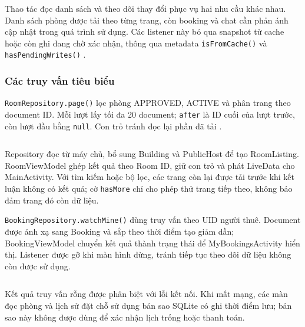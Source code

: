Thao tác đọc danh sách và theo dõi thay đổi phục vụ hai nhu cầu khác nhau. Danh sách phòng được tải theo từng trang, còn booking và chat cần phản ánh cập nhật trong quá trình sử dụng. Các listener này bỏ qua snapshot từ cache hoặc còn ghi đang chờ xác nhận, thông qua metadata \texttt{isFrom\allowbreak{}Cache()} và \texttt{hasPending\allowbreak{}Writes()} \parencite{firebase_listeners}.


\subsubsection{Các truy vấn tiêu biểu}
\texttt{RoomRepository.page()} lọc phòng APPROVED, ACTIVE và phân trang theo document ID. Mỗi lượt lấy tối đa 20 document; \texttt{after} là ID cuối của lượt trước, còn lượt đầu bằng \texttt{null}. Con trỏ tránh đọc lại phần đã tải \parencite{firebase_queries,firebase_query_cursors}.

\par\medskip\noindent\begin{minipage}{\linewidth}
\inputminted[firstnumber=1]{java}{Resources/chapter4/code/room-query.java}
\end{minipage}\par\medskip

Repository đọc từ máy chủ, bổ sung Building và PublicHost để tạo RoomListing. RoomViewModel ghép kết quả theo Room ID, giữ con trỏ và phát LiveData cho MainActivity. Với tìm kiếm hoặc bộ lọc, các trang còn lại được tải trước khi kết luận không có kết quả; cờ \texttt{hasMore} chỉ cho phép thử trang tiếp theo, không bảo đảm trang đó còn dữ liệu.

\texttt{BookingRepository.watchMine()} dùng truy vấn theo UID người thuê. Document được ánh xạ sang Booking và sắp theo thời điểm tạo giảm dần; BookingViewModel chuyển kết quả thành trạng thái để MyBookingsActivity hiển thị. Listener được gỡ khi màn hình dừng, tránh tiếp tục theo dõi dữ liệu không còn được sử dụng.

\par\medskip\noindent\begin{minipage}{\linewidth}
\inputminted[firstnumber=1]{java}{Resources/chapter4/code/booking-query-listener.java}
\end{minipage}\par\medskip

Kết quả truy vấn rỗng được phân biệt với lỗi kết nối. Khi mất mạng, các màn đọc phòng và lịch sử đặt chỗ sử dụng bản sao SQLite có ghi thời điểm lưu; bản sao này không được dùng để xác nhận lịch trống hoặc thanh toán.

